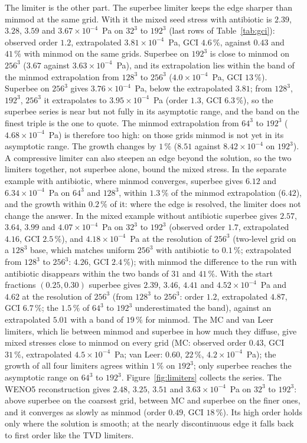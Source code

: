 \documentclass[11pt,a4paper]{article}
\begin{document}
The limiter is the other part. The superbee limiter keeps the edge sharper than minmod at the same grid. With it the mixed seed stress with antibiotic is $2.39$, $3.28$, $3.59$ and $3.67\times10^{-4}$~Pa on $32^3$ to $192^3$ (last rows of Table~\ref{tab:gci}): observed order $1.2$, extrapolated $3.81\times10^{-4}$~Pa, GCI $4.6\,\%$, against $0.43$ and $41\,\%$ with minmod on the same grids. Superbee on $192^3$ is close to minmod on $256^3$ ($3.67$ against $3.63\times10^{-4}$~Pa), and its extrapolation lies within the band of the minmod extrapolation from $128^3$ to $256^3$ ($4.0\times10^{-4}$~Pa, GCI $13\,\%$). Superbee on $256^3$ gives $3.76\times10^{-4}$~Pa, below the extrapolated $3.81$; from $128^3$, $192^3$, $256^3$ it extrapolates to $3.95\times10^{-4}$~Pa (order $1.3$, GCI $6.3\,\%$), so the superbee series is near but not fully in its asymptotic range, and the band on the finest triple is the one to quote. The minmod extrapolation from $64^3$ to $192^3$ ($4.68\times10^{-4}$~Pa) is therefore too high: on those grids minmod is not yet in its asymptotic range. The growth changes by $1\,\%$ ($8.51$ against $8.42\times10^{-4}$ on $192^3$). A compressive limiter can also steepen an edge beyond the solution, so the two limiters together, not superbee alone, bound the mixed stress. In the separate example with antibiotic, where minmod converges, superbee gives $6.12$ and $6.34\times10^{-4}$~Pa on $64^3$ and $128^3$, within $1.3\,\%$ of the minmod extrapolation ($6.42$), and the growth within $0.2\,\%$ of it: where the edge is resolved, the limiter does not change the answer. In the mixed example without antibiotic superbee gives $2.57$, $3.64$, $3.99$ and $4.07\times10^{-4}$~Pa on $32^3$ to $192^3$ (observed order $1.7$, extrapolated $4.16$, GCI $2.5\,\%$), and $4.18\times10^{-4}$~Pa at the resolution of $256^3$ (two-level grid on a $128^3$ base, which matches uniform $256^3$ with antibiotic to $0.1\,\%$; extrapolated from $128^3$ to $256^3$: $4.26$, GCI $2.4\,\%$); with minmod the difference to the run with antibiotic disappears within the two bands of $31$ and $41\,\%$. With the start fractions $(0.25,0.30)$ superbee gives $2.39$, $3.46$, $4.41$ and $4.52\times10^{-4}$~Pa and $4.62$ at the resolution of $256^3$ (from $128^3$ to $256^3$: order $1.2$, extrapolated $4.87$, GCI $6.7\,\%$; the $1.5\,\%$ of $64^3$ to $192^3$ underestimated the band), against an extrapolated $5.01$ with a band of $19\,\%$ for minmod. The MC and van Leer limiters, which lie between minmod and superbee in how much they diffuse, give mixed stresses close to minmod on every grid (MC: observed order $0.43$, GCI $31\,\%$, extrapolated $4.5\times10^{-4}$~Pa; van Leer: $0.60$, $22\,\%$, $4.2\times10^{-4}$~Pa); the growth of all four limiters agrees within $1\,\%$ on $192^3$; only superbee reaches the asymptotic range on $64^3$ to $192^3$. Figure~\ref{fig:limiters} collects the series. The WENO5 reconstruction \citep{JiangShu1996} gives $2.48$, $3.25$, $3.51$ and $3.63\times10^{-4}$~Pa on $32^3$ to $192^3$: above superbee on the coarsest grid, between MC and superbee on the finer ones, and it converges as slowly as minmod (order $0.49$, GCI $18\,\%$). Its high order holds only where the solution is smooth; at the nearly discontinuous edge it falls back to first order like the TVD limiters.
\end{document}
